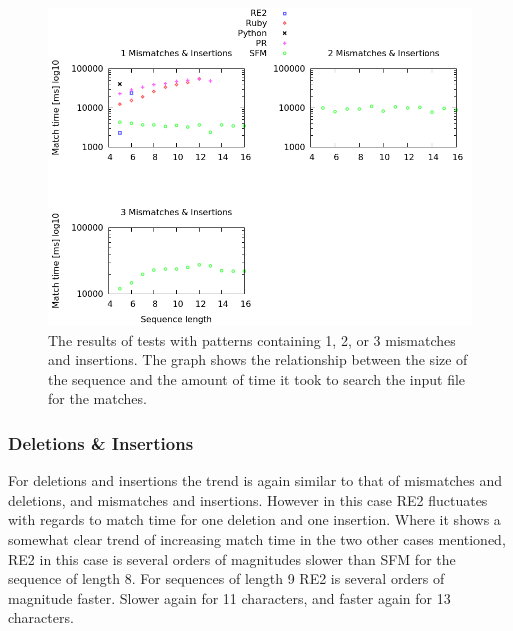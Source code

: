 \documentclass[12pt]{article}
\theoremstyle{definition}
\begin{document}
\begin{figure}[H]
	\begin{center}
		\includegraphics[scale=0.55]{graphs/mismatches_insertions.png}	
	\end{center}
	\caption{The results of tests with patterns containing 1, 2, or 3 mismatches and insertions. The graph shows the relationship between the size of the sequence and the amount of time it took to search the input file for the matches.}
	\label{graph:cases:combinations}
\end{figure}

\subsubsection{Deletions \& Insertions}

For deletions and insertions the trend is again similar to that of mismatches and deletions, and mismatches and insertions. However in this case RE2 fluctuates with regards to match time for one deletion and one insertion. Where it shows a somewhat clear trend of increasing match time in the two other cases mentioned, RE2 in this case is several orders of magnitudes slower than SFM for the sequence of length 8. For sequences of length 9 RE2 is several orders of magnitude faster. Slower again for 11 characters, and faster again for 13 characters.
\end{document}
